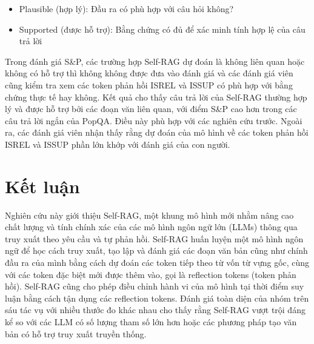 \documentclass{article}
\begin{document}
\begin{itemize}
    \item Plausible (hợp lý): Đầu ra có phù hợp với câu hỏi không?
    \item Supported (được hỗ trợ): Bằng chứng có đủ để xác minh tính hợp lệ của câu trả lời 
\end{itemize}

Trong đánh giá S\&P, các trường hợp Self-RAG dự đoán là không liên quan hoặc không có hỗ trợ thì không không được đưa vào đánh giá và các đánh giá viên cũng kiểm tra xem các token phản hồi ISREL và ISSUP có phù hợp với bằng chứng thực tế hay không. Kết quả cho thấy câu trả lời của Self-RAG thường hợp lý và được hỗ trợ bởi các đoạn văn liên quan, với điểm S\&P cao hơn trong các câu trả lời ngắn của PopQA. Điều này phù hợp với các nghiên cứu trước. Ngoài ra, các đánh giá viên nhận thấy rằng dự đoán của mô hình về các token phản hồi ISREL và ISSUP phần lớn khớp với đánh giá của con người. 


\section{Kết luận}
Nghiên cứu này giới thiệu Self-RAG, một khung mô hình mới nhằm nâng cao chất lượng và tính chính xác của các mô hình ngôn ngữ lớn (LLMs) thông qua truy xuất theo yêu cầu và tự phản hồi. Self-RAG huấn luyện một mô hình ngôn ngữ để học cách truy xuất, tạo lập và đánh giá các đoạn văn bản cũng như chính đầu ra của mình bằng cách dự đoán các token tiếp theo từ vốn từ vựng gốc, cùng với các token đặc biệt mới được thêm vào, gọi là reflection tokens (token phản hồi). Self-RAG cũng cho phép điều chỉnh hành vi của mô hình tại thời điểm suy luận bằng cách tận dụng các reflection tokens. Đánh giá toàn diện của nhóm trên sáu tác vụ với nhiều thước đo khác nhau cho thấy rằng Self-RAG vượt trội đáng kể so với các LLM có số lượng tham số lớn hơn hoặc các phương pháp tạo văn bản có hỗ trợ truy xuất truyền thống.

\printbibliography
\end{document}
